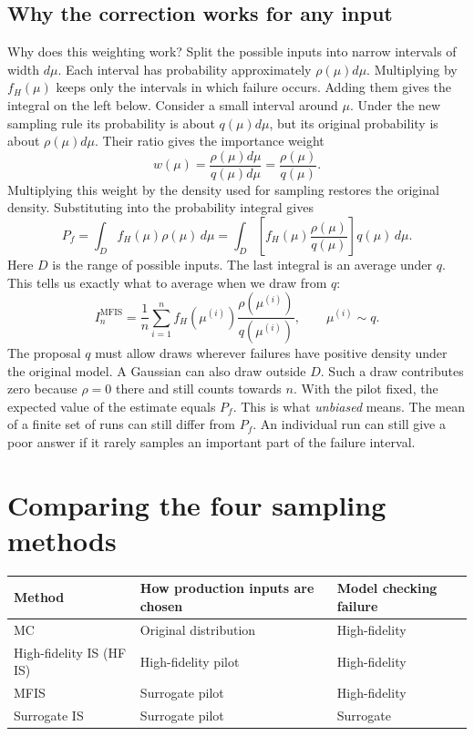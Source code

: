 \documentclass[11pt,a4paper]{article}
\begin{document}
\subsection{Why the correction works for any input}
Why does this weighting work? Split the possible inputs into narrow intervals of width $d\mu$. Each interval has probability approximately $\rho(\mu)d\mu$. Multiplying by $f_H(\mu)$ keeps only the intervals in which failure occurs. Adding them gives the integral on the left below. Consider a small interval around $\mu$. Under the new sampling rule its probability is about $q(\mu)d\mu$, but its original probability is about $\rho(\mu)d\mu$. Their ratio gives the importance weight
\[
w(\mu)=\frac{\rho(\mu)d\mu}{q(\mu)d\mu}=\frac{\rho(\mu)}{q(\mu)}.
\]
Multiplying this weight by the density used for sampling restores the original density. Substituting into the probability integral gives
\begin{equation}
P_f=\int_D f_H(\mu)\rho(\mu)\,d\mu
=\int_D \left[f_H(\mu)\frac{\rho(\mu)}{q(\mu)}\right]q(\mu)\,d\mu .
\end{equation}
Here $D$ is the range of possible inputs. The last integral is an average under $q$. This tells us exactly what to average when we draw from $q$:
\begin{equation}
I_n^{\mathrm{MFIS}}=\frac{1}{n}\sum_{i=1}^n f_H(\mu^{(i)})\frac{\rho(\mu^{(i)})}{q(\mu^{(i)})},\qquad \mu^{(i)}\sim q.
\end{equation}
The proposal $q$ must allow draws wherever failures have positive density under the original model. A Gaussian can also draw outside $D$. Such a draw contributes zero because $\rho=0$ there and still counts towards $n$. With the pilot fixed, the expected value of the estimate equals $P_f$. This is what \emph{unbiased} means. The mean of a finite set of runs can still differ from $P_f$. An individual run can still give a poor answer if it rarely samples an important part of the failure interval.



\section{Comparing the four sampling methods}
\begin{center}\small
\begin{tabular}{lll}
\toprule
Method & How production inputs are chosen & Model checking failure \\
\midrule
MC & Original distribution & High-fidelity \\
High-fidelity IS (HF IS) & High-fidelity pilot & High-fidelity \\
MFIS & Surrogate pilot & High-fidelity \\
Surrogate IS & Surrogate pilot & Surrogate \\
\bottomrule
\end{tabular}
\end{center}
\end{document}
